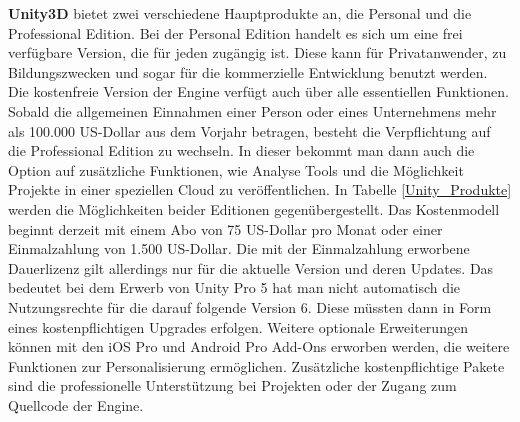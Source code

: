\medskip
\textbf{Unity3D} bietet zwei verschiedene Hauptprodukte an, die Personal und die Professional Edition. Bei der Personal Edition handelt es sich um eine frei verfügbare Version, die für jeden zugängig ist. Diese kann für Privatanwender, zu Bildungszwecken und sogar für die kommerzielle Entwicklung benutzt werden. Die kostenfreie Version der Engine verfügt auch über alle essentiellen Funktionen. Sobald die allgemeinen Einnahmen einer Person oder eines Unternehmens mehr als 100.000 US-Dollar aus dem Vorjahr betragen, besteht die Verpflichtung auf die Professional Edition zu wechseln. In dieser bekommt man dann auch die Option auf zusätzliche Funktionen, wie Analyse Tools und die Möglichkeit Projekte in einer speziellen Cloud zu veröffentlichen. In Tabelle \ref{Unity_Produkte} werden die Möglichkeiten beider Editionen gegenübergestellt. Das Kostenmodell beginnt derzeit mit einem Abo von 75 US-Dollar pro Monat oder einer Einmalzahlung von 1.500 US-Dollar. Die mit der Einmalzahlung erworbene Dauerlizenz gilt allerdings nur für die aktuelle Version und deren Updates. Das bedeutet bei dem Erwerb von Unity Pro 5 hat man nicht automatisch die Nutzungsrechte für die darauf folgende Version 6. Diese müssten dann in Form eines kostenpflichtigen Upgrades erfolgen. Weitere optionale Erweiterungen können mit den iOS Pro und Android Pro Add-Ons erworben werden, die weitere Funktionen zur Personalisierung ermöglichen. Zusätzliche kostenpflichtige Pakete sind die professionelle Unterstützung bei Projekten oder der Zugang zum Quellcode der Engine. \citep{unity_products}

